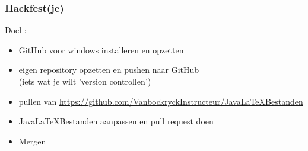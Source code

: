 \documentclass{beamer}
\begin{document}
\begin{frame}

\frametitle{Hackfest(je)}

{\Large Doel :

\begin{itemize}
\item GitHub voor windows installeren en opzetten
\item eigen repository opzetten en pushen naar GitHub\\ (iets wat je wilt 'version controllen')
\item pullen van {\footnotesize \url{https://github.com/VanbockryckInstructeur/JavaLaTeXBestanden}}
\item JavaLaTeXBestanden aanpassen en pull request doen
\item Mergen
\end{itemize}}

\end{frame}
\end{document}
